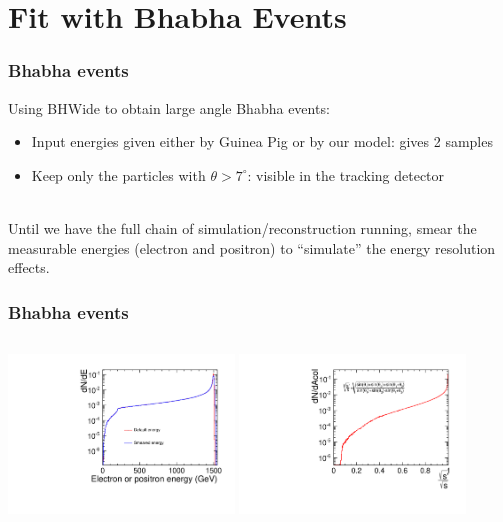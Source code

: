 \documentclass{beamer}
\begin{document}
\section{Fit with Bhabha Events}
\begin{frame}
\frametitle{Bhabha events}
Using \alert{BHWide} to obtain large angle Bhabha events:
\begin{itemize}
  \item Input energies given either by Guinea Pig or by our model: gives 2
  samples
  \item Keep only the particles with $\theta>7^\circ$: visible in the
  tracking detector
\end{itemize}
~\\
Until we have the full chain of simulation/reconstruction running, \alert{smear}
the \alert{measurable energies} (electron and positron) to ``simulate'' the
energy \alert{resolution} effects.
\end{frame}
\begin{frame}
\frametitle{Bhabha events}
\begin{columns}[c]
\column{6cm}
\includegraphics[width=6cm]{ElectronEnergyFCAL.pdf}
\column{6cm}
\includegraphics[width=6cm]{AccolinearityFCAL.pdf}
\end{columns}
\end{frame}
\end{document}
